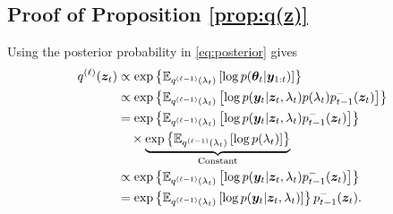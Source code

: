 \documentclass[10pt,twocolumn,twoside]{IEEEtran}
\newcommand{\e}[1]{\exp\left\{#1\right\}}
\newcommand{\E}[2][]{ \mathbb{E}_{#1}\left[#2\right] } %
\newcommand{\fs}{\text{.}} %
\newcommand{\y}{{ \bm{y} }}
\newcommand{\z}{{ \bm{z} }}
\begin{document}
\begin{appendices}
\section{Proof of Proposition \ref{prop:q(z)}} \label{app:proof-q(z)}
Using the posterior probability in \eqref{eq:posterior} gives
\begin{align} \label{eq:propto-z}
    q^{(\ell)}(\z_t) &\propto \e{\E[q^{(\ell-1)}(\lambda_t)]{\log{p(\bm\theta_t|\y_{1:t})}}} \nonumber\\
    &\propto \e{\E[q^{(\ell-1)}(\lambda_t)]{\log{p(\y_t|\z_t,\lambda_t)p(\lambda_t)p^-_{t-1}(\z_t)}}} \nonumber\\
    &= \e{\E[q^{(\ell-1)}(\lambda_t)]{\log{p(\y_t|\z_t,\lambda_t)p^-_{t-1}(\z_t)}}} \nonumber\\
    &\quad\times \underbrace{\e{\E[q^{(\ell-1)}(\lambda_t)]{\log{p(\lambda_t)}}}}_{\rm Constant} \\
    &\propto \e{\E[q^{(\ell-1)}(\lambda_t)]{\log{p(\y_t|\z_t,\lambda_t)p^-_{t-1}(\z_t)}}} \nonumber\\
    &= \e{\E[q^{(\ell-1)}(\lambda_t)]{\log{p(\y_t|\z_t,\lambda_t)}}}p^-_{t-1}(\z_t)\fs \nonumber
\end{align}


\end{appendices}
\end{document}

